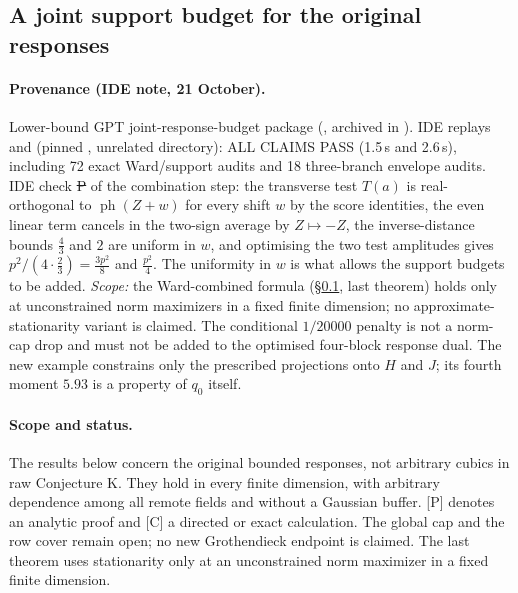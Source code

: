 \subsection{A joint support budget for the original responses}
\label{sec:joint-response-budget}
\paragraph{Provenance (IDE note, 21 October).} Lower-bound GPT joint-response-budget package (, archived in
). IDE replays  and  (pinned , unrelated directory):
ALL CLAIMS PASS (1.5\,s and 2.6\,s), including 72 exact Ward/support audits and 18 three-branch envelope audits. IDE check \st{P} of the combination step: the transverse
test $T(a)$ is real-orthogonal to $\operatorname{ph}(Z+w)$ for every shift $w$ by the score identities, the even linear term cancels in the two-sign average by
$Z\mapsto-Z$, the inverse-distance bounds $\frac43$ and $2$ are uniform in $w$, and optimising the two test amplitudes gives $p^2/(4\cdot\frac23)=\frac{3p^2}8$ and $\frac{p^2}4$.
The uniformity in $w$ is what allows the support budgets to be added.
\emph{Scope:} the Ward-combined formula (\S\ref{sec:joint-response-budget}, last theorem) holds only at unconstrained norm maximizers in a fixed finite dimension; no
approximate-stationarity variant is claimed. The conditional $1/20000$ penalty is not a norm-cap drop and must not be added to the optimised four-block response dual.
The new example constrains only the prescribed projections onto $H$ and $J$; its fourth moment $5.93$ is a property of $q_0$ itself.


\paragraph{Scope and status.}
The results below concern the original bounded responses, not arbitrary
cubics in raw Conjecture K. They hold in every finite dimension, with
arbitrary dependence among all remote fields and without a Gaussian buffer.
[P] denotes an analytic proof and [C] a directed or exact calculation.
The global cap and the row cover remain open; no new Grothendieck endpoint
is claimed. The last theorem uses stationarity only at an unconstrained
norm maximizer in a fixed finite dimension.


